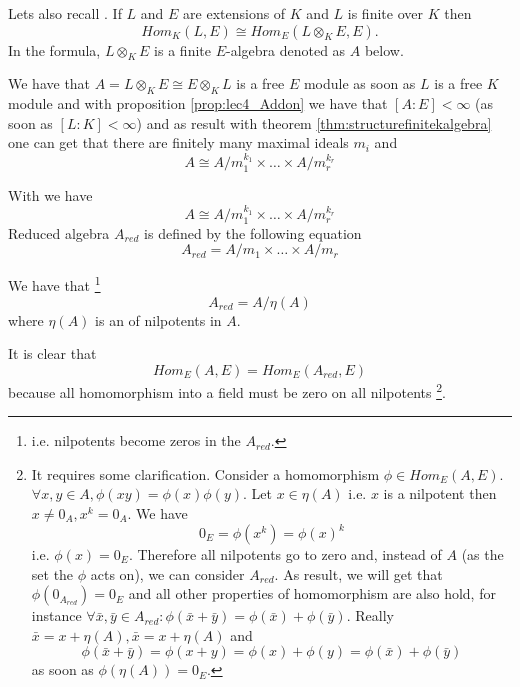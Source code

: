 Lets also recall . If $L$ and $E$ are
extensions of $K$ and $L$ is finite over $K$ then
\[
Hom_K\left(L, E\right) \cong
Hom_E\left(
L \otimes_K E, E
\right).
\]
In the formula, $L \otimes_K E$ is a finite $E$-algebra denoted as $A$
below.
\begin{myremark}
  We have that $A = L \otimes_K E \cong E \otimes_K L$ is a free $E$
  module as soon as $L$ is a free $K$ module and with proposition
  \ref{prop:lec4_Addon} we have that $\left[A : E\right] < \infty$
  (as soon as $\left[L : K\right] < \infty$)
  and
  as result with theorem \ref{thm:structurefinitekalgebra} one can get
  that there are finitely many maximal ideals $m_i$ and
  \[
  A \cong A/m_1^{k_1} \times \dots \times A/m_r^{k_r}
  \]
  \label{rem:lec5_own1}
\end{myremark}

\begin{definition}
  With  we have
  \[
  A \cong A/m_1^{k_1} \times \dots \times A/m_r^{k_r}
  \]
  Reduced algebra $A_{red}$ is defined by the following equation
  \[
  A_{red} = A/m_1 \times \dots \times A/m_r
  \]
  \label{def:reducedalgebra}
\end{definition}

We have that
\footnote{
  i.e. nilpotents become zeros in the $A_{red}$.
}
\[
A_{red} = A /\eta\left(A\right)
\]
where $\eta\left(A\right)$ is an  of
nilpotents in $A$.

It is clear that
\[
Hom_E\left(A, E\right) =
Hom_E\left(A_{red}, E\right)
\]
because all homomorphism into a field must be zero on all nilpotents
\footnote{
  It requires some clarification. Consider a homomorphism
  $\phi \in Hom_E\left(A, E\right)$. $\forall x,y \in A, \phi(xy) =
  \phi(x)\phi(y)$. Let $x \in \eta\left(A\right)$ i.e. $x$ is a
  nilpotent then $x \ne 0_A, x^k = 0_A$. We have
  \[
  0_E = \phi(x^k) = \phi(x)^k
  \]
  i.e. $\phi(x) =  0_E$. Therefore all nilpotents go to zero and,
  instead of $A$ (as the set the $\phi$ acts on), we can consider
  $A_{red}$. As result, we will get that $\phi(0_{A_{red}}) = 0_E$ and all
  other properties of homomorphism are also hold, for instance
  $\forall \bar{x},\bar{y} \in A_{red}: \phi(\bar{x}+\bar{y}) =
  \phi(\bar{x}) + \phi(\bar{y})$. Really
  $\bar{x} = x + \eta(A), \bar{x} = x + \eta(A)$ and
  \[
  \phi(\bar{x}+\bar{y}) =
  \phi(x+y) = \phi(x) + \phi(y) =
  \phi(\bar{x}) + \phi(\bar{y})
  \]
  as soon as $\phi(\eta(A)) = 0_E$.
}. 

